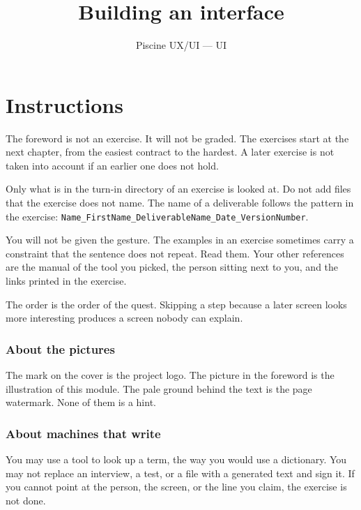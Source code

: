 \documentclass{training}
\begin{document}
\title{Building an interface}
\subtitle{Piscine UX/UI --- UI}
\maketitle

\newpage
\tableofcontents
\newpage


\chapter{Instructions}

The foreword is not an exercise. It will not be graded. The exercises start at the next chapter, from the easiest contract to the hardest. A later exercise is not taken into account if an earlier one does not hold.

Only what is in the turn-in directory of an exercise is looked at. Do not add files that the exercise does not name. The name of a deliverable follows the pattern in the exercise: \texttt{Name\_FirstName\_DeliverableName\_Date\_VersionNumber}.

You will not be given the gesture. The examples in an exercise sometimes carry a constraint that the sentence does not repeat. Read them. Your other references are the manual of the tool you picked, the person sitting next to you, and the links printed in the exercise.

The order is the order of the quest. Skipping a step because a later screen looks more interesting produces a screen nobody can explain.

\subsection*{About the pictures}

The mark on the cover is the project logo. The picture in the foreword is the illustration of this module. The pale ground behind the text is the page watermark. None of them is a hint.

\subsection*{About machines that write}

You may use a tool to look up a term, the way you would use a dictionary. You may not replace an interview, a test, or a file with a generated text and sign it. If you cannot point at the person, the screen, or the line you claim, the exercise is not done.
\end{document}
